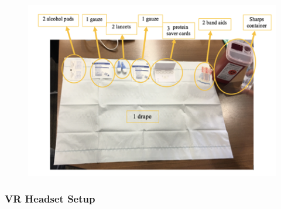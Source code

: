\documentclass[]{book}
\begin{document}
\begin{figure}
\centering
\includegraphics{images/dbs/2.png}
\caption{}
\end{figure}

\hypertarget{vr-headset-setup}{%
\subsubsection{VR Headset Setup}\label{vr-headset-setup}}
\end{document}
